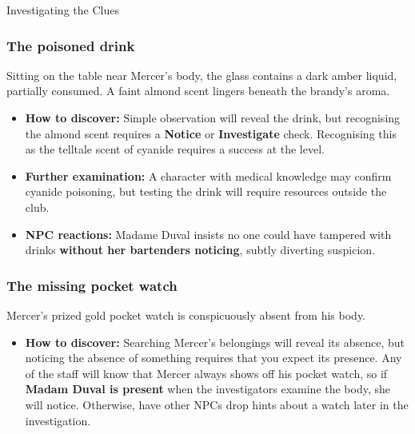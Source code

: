 

\begin{WyrdComment}{Investigating the Clues}
	\subsubsection*{The poisoned drink}
	Sitting on the table near Mercer's body, the glass contains a dark amber liquid, partially consumed. A faint almond scent lingers beneath the brandy's aroma.  
	\begin{itemize}
		\item \textbf{How to discover:} Simple observation will reveal the drink, but recognising the almond scent requires a \Basic \textbf{Notice} or \textbf{Investigate} check. Recognising this as the telltale scent of cyanide requires a success at the \Difficult level.
		\item \textbf{Further examination:} A character with medical knowledge may confirm cyanide poisoning, but testing the drink will require resources outside the club.
		\item \textbf{NPC reactions:} Madame Duval insists no one could have tampered with drinks \textbf{without her bartenders noticing}, subtly diverting suspicion.
	\end{itemize}
	
	\subsubsection*{The missing pocket watch}
	Mercer’s prized gold pocket watch is conspicuously absent from his body. 
	\begin{itemize}
		\item \textbf{How to discover:} Searching Mercer’s belongings will reveal its absence, but noticing the absence of something requires that you expect its presence. Any of the staff will know that Mercer always shows off his pocket watch, so if \textbf{Madam Duval is present} when the investigators examine the body, she will notice. Otherwise, have other NPCs drop hints about a watch later in the investigation.
	\end{itemize}
	

\end{WyrdComment}
